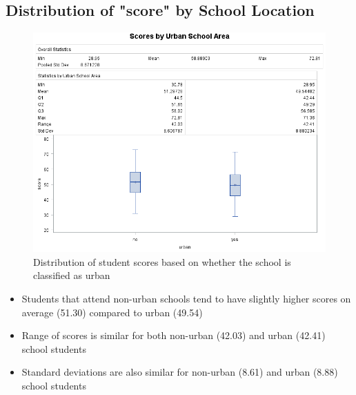 \documentclass[12pt]{article}
\begin{document}
\subsection{Distribution of "score" by School Location}
\begin{figure}[h]
    \centering
    \includegraphics[width=1.14\textwidth]{images/scores_by_urban.png}
    \caption{Distribution of student scores based on whether the school is classified as urban}
    \label{scores_by_urban}
\end{figure}

\begin{itemize}
    \item Students that attend non-urban schools tend to have slightly higher scores on average (51.30) compared to urban (49.54)
    \item Range of scores is similar for both non-urban (42.03) and urban (42.41) school students
    \item Standard deviations are also similar for non-urban (8.61) and urban (8.88) school students
\end{itemize}
\newpage
\end{document}

